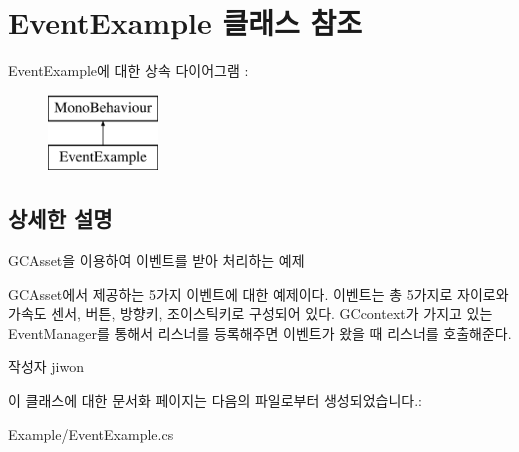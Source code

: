 \hypertarget{class_event_example}{}\section{Event\+Example 클래스 참조}
\label{class_event_example}
Event\+Example에 대한 상속 다이어그램 \+: \begin{figure}[H]
\begin{center}
\leavevmode
\includegraphics[height=2.000000cm]{class_event_example}
\end{center}
\end{figure}


\subsection{상세한 설명}
G\+C\+Asset을 이용하여 이벤트를 받아 처리하는 예제

G\+C\+Asset에서 제공하는 5가지 이벤트에 대한 예제이다. 이벤트는 총 5가지로 자이로와 가속도 센서, 버튼, 방향키, 조이스틱키로 구성되어 있다. G\+Ccontext가 가지고 있는 Event\+Manager를 통해서 리스너를 등록해주면 이벤트가 왔을 때 리스너를 호출해준다. \begin{DoxyAuthor}{작성자}
jiwon 
\end{DoxyAuthor}


이 클래스에 대한 문서화 페이지는 다음의 파일로부터 생성되었습니다.\+:\begin{DoxyCompactItemize}
\item 
Example/Event\+Example.\+cs\end{DoxyCompactItemize}
